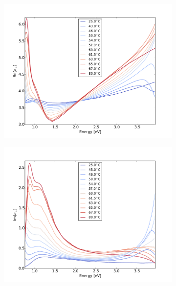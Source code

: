 %
%
\begin{figure}
    \centering
    \begin{subfigure}[b]{0.49\textwidth}
        \centering
        \includegraphics[width=\textwidth]{Results/Sim3/re_alpha_perp.pdf}
        \caption{}
        \label{fig:}
    \end{subfigure}
    \begin{subfigure}[b]{0.49\textwidth}
        \centering
        \includegraphics[width=\textwidth]{Results/Sim3/im_alpha_perp.pdf}
        \caption{}
        \label{fig:}
    \end{subfigure}

\end{figure}
